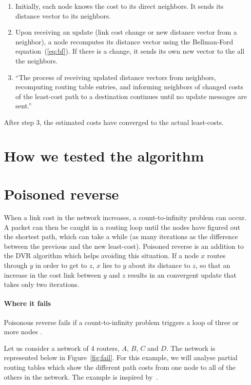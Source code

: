\documentclass[12pt,a4paper]{article}
\begin{document}
\begin{enumerate}
\item Initially, each node knows the cost to its direct neighbors. It sends its distance vector to its neighbors.

\item Upon receiving an update (link cost change or new distance vector from a neighbor), a node recomputes its distance vector using the Bellman-Ford equation~(\ref{eq:bf}). If there is a change, it sends its own new vector to the all the neighbors.

\item ``The process of receiving updated distance vectors from neighbors, recomputing routing table entries, and informing neighbors of changed costs of the least-cost path to a destination continues until no update messages are sent.''~\cite[p.~375]{cn}
\end{enumerate}

After step 3, the estimated costs have converged to the actual least-costs.

\section{How we tested the algorithm}

\section{Poisoned reverse}
When a link cost in the network increases, a count-to-infinity problem can occur. A packet can then be caught in a routing loop until the nodes have figured out the shortest path, which can take a while (as many iterations as the difference between the previous and the new least-cost). Poisoned reverse is an addition to the DVR algorithm which helps avoiding this situation. If a node $x$ routes through $y$ in order to get to $z$, $x$ lies to $y$ about its distance to $z$, so that an increase in the cost link between $y$ and $z$ results in an convergent update that takes only two iterations. 

\paragraph{Where it fails}
Poisonous reverse fails if a count-to-infinity problem triggers a loop of three or more nodes \cite[p.~378]{cn}.

Let us consider a network of 4 routers, $A$, $B$, $C$ and $D$. The network is represented below in Figure~\ref{fig:fail}. For this example, we will analyse partial routing tables which show the different path costs from one node to all of the others in the network. The example is inspired by~\cite{berkeley}.
\end{document}

